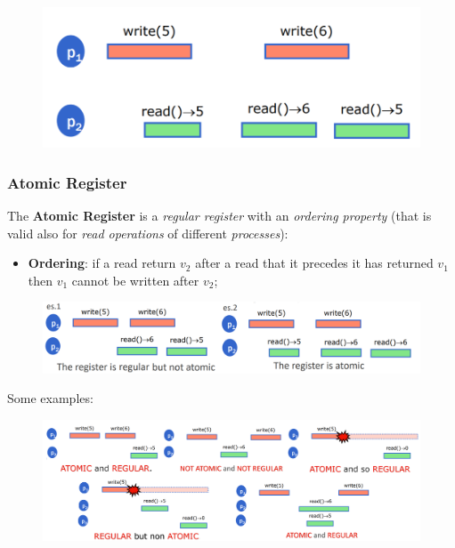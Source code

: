 \documentclass{article}
\begin{document}
\begin{figure}[H]
  \centering
  \includegraphics[scale=0.5]{cattura64.png}
\end{figure}
\subsubsection{Atomic Register}
The \textbf{Atomic Register} is a \emph{regular register} with an \emph{ordering property} (that is valid also for \emph{read operations} of different \emph{processes}):
\begin{itemize}
\item \textbf{Ordering}: if a read return $v_2$ after a read that it precedes it has returned $v_1$ then $v_1$ cannot be written after $v_2$;
\end{itemize}
\begin{figure}[H]
  \centering
  \includegraphics[scale=0.5]{cattura65.png}
\end{figure}
Some examples:
\begin{figure}[H]
  \centering
  \includegraphics[scale=0.5]{cattura66.png}
\end{figure}
\end{document}
